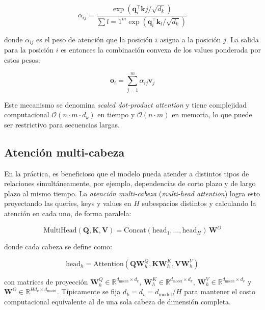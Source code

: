 \begin{equation}
\alpha_{ij} = \frac{\exp\left(\mathbf{q}_i^\top \mathbf{k}j / \sqrt{d_k}\right)}{\sum{l=1}^{m} \exp\left(\mathbf{q}_i^\top \mathbf{k}_l / \sqrt{d_k}\right)}
\end{equation}

donde $\alpha_{ij}$ es el peso de atención que la posición $i$ asigna a la posición $j$. La salida para la posición $i$ es entonces la combinación convexa de los values ponderada por estos pesos:

\begin{equation}
\mathbf{o}_i = \sum_{j=1}^{m} \alpha_{ij} \mathbf{v}_j
\end{equation}

Este mecanismo se denomina \textit{scaled dot-product attention} y tiene complejidad computacional $\mathcal{O}(n \cdot m \cdot d_k)$ en tiempo y $\mathcal{O}(n \cdot m)$ en memoria, lo que puede ser restrictivo para secuencias largas.

\subsection{Atención multi-cabeza}

En la práctica, es beneficioso que el modelo pueda atender a distintos tipos de relaciones simultáneamente, por ejemplo, dependencias de corto plazo y de largo plazo al mismo tiempo. La \textit{atención multi-cabeza} (\textit{multi-head attention}) logra esto proyectando las queries, keys y values en $H$ subespacios distintos y calculando la atención en cada uno, de forma paralela:

\begin{equation}
\text{MultiHead}(\mathbf{Q}, \mathbf{K}, \mathbf{V}) = \text{Concat}(\text{head}_1, \ldots, \text{head}_H) \,\mathbf{W}^O
\end{equation}

donde cada cabeza se define como:

\begin{equation}
\text{head}_h = \text{Attention}(\mathbf{Q}\mathbf{W}_h^Q, \mathbf{K}\mathbf{W}_h^K, \mathbf{V}\mathbf{W}_h^V)
\end{equation}

con matrices de proyección $\mathbf{W}_h^Q \in \mathbb{R}^{d_{\text{model}} \times d_k}$, $ \mathbf{W}_h^K \in \mathbb{R}^{d_{\text{model}} \times d_k}$, $\mathbf{W}_h^V \in \mathbb{R}^{d_{\text{model}} \times d_v}$ y $\mathbf{W}^O \in \mathbb{R}^{H d_v \times d_{\text{model}}}$. Típicamente se fija $d_k = d_v = d_{\text{model}} / H$ para mantener el costo computacional equivalente al de una sola cabeza de dimensión completa.

